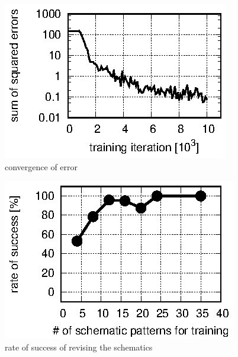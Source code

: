 \documentclass[twocolumn]{article}
\begin{document}
\begin{figure}[tb]
 \begin{center}
  \begin{minipage}{\hsize}
   \includegraphics[width=\hsize]{fig/errors.eps}
   \caption{convergence of error}
   \label{fig:errors}
  \end{minipage}
 \end{center}
\end{figure}

\begin{figure}[tb]
 \begin{center}
  \begin{minipage}{\hsize}
   \includegraphics[width=\hsize]{fig/test_data.eps}
   \caption{rate of success of revising the schematics}
   \label{fig:test_data}
  \end{minipage}
 \end{center}
\end{figure}
\end{document}
